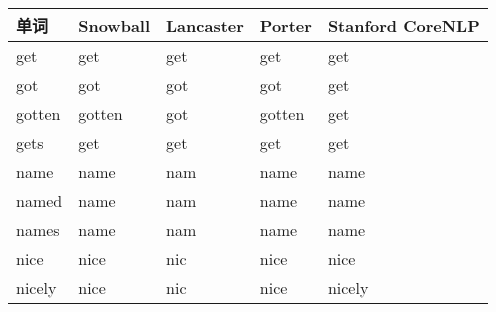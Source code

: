 \begin{center}  
\begin{longtabu} to \textwidth{X|X|X|X|X}
\hline
单词 & Snowball & Lancaster & Porter & Stanford CoreNLP\\
\hline
get & get & get & get & get\\
\hline
got & got & got & got & get\\
\hline
gotten & gotten & got & gotten & get\\
\hline
gets & get & get & get & get\\
\hline
name & name & nam & name & name\\
\hline
named & name & nam & name & name\\
\hline
names & name & nam & name & name\\
\hline
nice & nice & nic & nice & nice\\
\hline
nicely & nice & nic & nice & nicely\\
\hline
\end{longtabu}
\end{center} 


